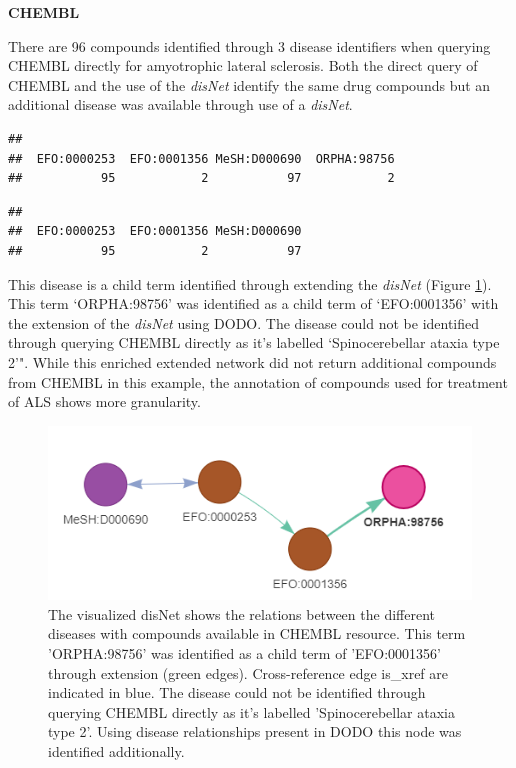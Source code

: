 \documentclass[9pt,a4paper,]{extarticle}
\begin{document}
\textbf{CHEMBL}

There are 96 compounds identified through 3 disease identifiers when querying CHEMBL directly for amyotrophic lateral sclerosis. Both the direct query of CHEMBL and the use of the \emph{disNet} identify the same drug compounds but an additional disease was available through use of a \emph{disNet}.

\begin{verbatim}
## 
##  EFO:0000253  EFO:0001356 MeSH:D000690  ORPHA:98756 
##           95            2           97            2
\end{verbatim}

\begin{verbatim}
## 
##  EFO:0000253  EFO:0001356 MeSH:D000690 
##           95            2           97
\end{verbatim}

This disease is a child term identified through extending the \emph{disNet} (Figure \ref{fig:disnetALSchembl}). This term `ORPHA:98756' was identified as a child term of `EFO:0001356' with the extension of the \emph{disNet} using DODO. The disease could not be identified through querying CHEMBL directly as it's labelled `Spinocerebellar ataxia type 2'". While this enriched extended network did not return additional compounds from CHEMBL in this example, the annotation of compounds used for treatment of ALS shows more granularity.

\begin{figure}

{\centering \includegraphics[width=0.5\linewidth]{fig/disNet_als_chembl} 

}

\caption{The visualized disNet shows the relations between the different diseases with compounds available in CHEMBL resource. This term 'ORPHA:98756' was identified as a child term of 'EFO:0001356' through extension (green edges). Cross-reference edge is\_xref are indicated in blue.  The disease could not be identified through querying CHEMBL directly as it's labelled 'Spinocerebellar ataxia type 2'. Using disease relationships present in DODO this node was identified additionally.}\label{fig:disnetALSchembl}
\end{figure}
\end{document}
